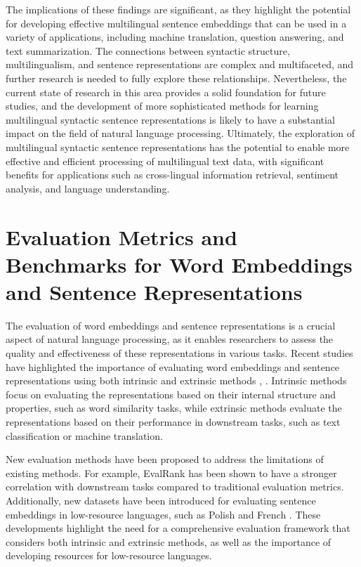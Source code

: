 \documentclass[conference]{IEEEtran}
\begin{document}
The implications of these findings are significant, as they highlight the potential for developing effective multilingual sentence embeddings that can be used in a variety of applications, including machine translation, question answering, and text summarization. The connections between syntactic structure, multilingualism, and sentence representations are complex and multifaceted, and further research is needed to fully explore these relationships. Nevertheless, the current state of research in this area provides a solid foundation for future studies, and the development of more sophisticated methods for learning multilingual syntactic sentence representations is likely to have a substantial impact on the field of natural language processing. Ultimately, the exploration of multilingual syntactic sentence representations has the potential to enable more effective and efficient processing of multilingual text data, with significant benefits for applications such as cross-lingual information retrieval, sentiment analysis, and language understanding.

\section{Evaluation Metrics and Benchmarks for Word Embeddings and Sentence Representations}
The evaluation of word embeddings and sentence representations is a crucial aspect of natural language processing, as it enables researchers to assess the quality and effectiveness of these representations in various tasks. Recent studies have highlighted the importance of evaluating word embeddings and sentence representations using both intrinsic and extrinsic methods \cite{b1}, \cite{b2}. Intrinsic methods focus on evaluating the representations based on their internal structure and properties, such as word similarity tasks, while extrinsic methods evaluate the representations based on their performance in downstream tasks, such as text classification or machine translation.

New evaluation methods have been proposed to address the limitations of existing methods. For example, EvalRank \cite{b3} has been shown to have a stronger correlation with downstream tasks compared to traditional evaluation metrics. Additionally, new datasets have been introduced for evaluating sentence embeddings in low-resource languages, such as Polish \cite{b4} and French \cite{b5}. These developments highlight the need for a comprehensive evaluation framework that considers both intrinsic and extrinsic methods, as well as the importance of developing resources for low-resource languages.
\end{document}
